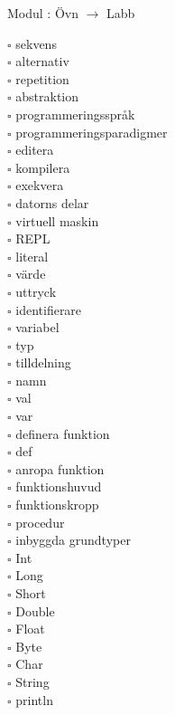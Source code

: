 
    Modul : Övn  $\rightarrow$ Labb 
    \begin{multicols}{3}\SlideFontTiny
    $\square$ sekvens \\
$\square$ alternativ \\
$\square$ repetition \\
$\square$ abstraktion \\
$\square$ programmeringsspråk \\
$\square$ programmeringsparadigmer \\
$\square$ editera \\
$\square$ kompilera \\
$\square$ exekvera \\
$\square$ datorns delar \\
$\square$ virtuell maskin \\
$\square$ REPL \\
$\square$ literal \\
$\square$ värde \\
$\square$ uttryck \\
$\square$ identifierare \\
$\square$ variabel \\
$\square$ typ \\
$\square$ tilldelning \\
$\square$ namn \\
$\square$ val \\
$\square$ var \\
$\square$ definera funktion \\
$\square$ def \\
$\square$ anropa funktion \\
$\square$ funktionshuvud \\
$\square$ funktionskropp \\
$\square$ procedur \\
$\square$ inbyggda grundtyper \\
$\square$ Int \\
$\square$ Long \\
$\square$ Short \\
$\square$ Double \\
$\square$ Float \\
$\square$ Byte \\
$\square$ Char \\
$\square$ String \\
$\square$ println \\

\end{multicols}
